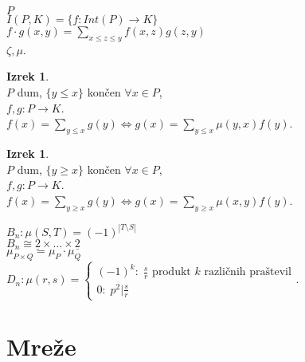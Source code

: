 \documentclass[a4paper, 12pt]{book}
\theoremstyle{definition}
\newtheorem{theorem}[counter]{Izrek}
\theoremstyle{remark}
\begin{document}

$P$ \\
$I(P, K) = \{f : Int(P) \to K\}$ \\
$f \cdot g(x, y) = \sum_{x \leq z \leq y} f(x, z) g(z, y)$ \\
$\zeta, \mu$.
\begin{theorem} \text{} \\
  $P$ dum, $\{y \leq x\}$ končen $\forall x \in P$, \\
  $f, g: P \to K$. \\
  $f(x) = \sum_{y \leq x} g(y) \iff g(x) = \sum_{y \leq x} \mu(y, x) f(y)$.
\end{theorem}
\begin{theorem} \text{} \\
  $P$ dum, $\{y \geq x\}$ končen $\forall x \in P$, \\
  $f, g: P \to K$. \\
  $f(x) = \sum_{y \geq x} g(y) \iff g(x) = \sum_{y \geq x} \mu(x, y) f(y)$.
\end{theorem}
$B_n: \mu(S, T) = (-1)^{|T \setminus S|}$ \\
$B_n \cong \underline{2} \times \dots \times \underline{2}$ \\
$\mu_{P \times Q} = \mu_P \cdot \mu_Q$ \\
$D_n: \mu(r, s) = \begin{cases}
  (-1)^k: \; \frac{s}{r} \text{ produkt } k \text{ različnih praštevil} \\
  0: \; p^2 | \frac{s}{r}
\end{cases}$.


\section{Mreže}
\end{document}
